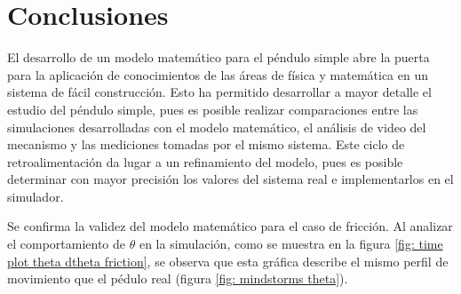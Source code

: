 \section{Conclusiones}

El desarrollo de un modelo matemático para el péndulo 
simple abre la puerta para la aplicación
de conocimientos de las áreas de física y matemática 
en un sistema de fácil construcción. 
Esto ha permitido desarrollar a mayor detalle el estudio
del péndulo simple, pues es posible realizar comparaciones
entre las simulaciones desarrolladas con el modelo matemático,
el análisis de video del mecanismo
y las mediciones tomadas por el mismo sistema.
Este ciclo de retroalimentación da lugar a un refinamiento del 
modelo, pues es posible determinar con mayor precisión los 
valores del sistema real e implementarlos en el simulador.

Se confirma la validez del modelo matemático para el caso de fricción.
Al analizar el comportamiento de $\theta$ en la simulación, 
como se muestra en la figura
\ref{fig: time plot theta dtheta friction},
se observa que esta gráfica describe el mismo
perfil de movimiento que el pédulo real (figura \ref{fig: mindstorms theta}).


